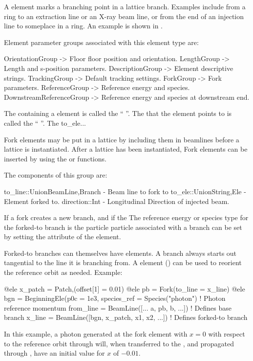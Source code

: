 A  element marks a branching point in a lattice branch. Examples include  from
a ring to an extraction line or an X-ray beam line, or  from the end of an injection line to
someplace in a ring. An example is shown in .

Element parameter groups associated with this element type are:
\TOPrule
\begin{example}
  OrientationGroup -> Floor floor position and orientation.  
  LengthGroup        -> Length and s-position parameters.  
  DescriptionGroup   -> Element descriptive strings.  
  TrackingGroup      -> Default tracking settings.  
  ForkGroup          -> Fork parameters. 
  ReferenceGroup     -> Reference energy and species. 
  DownstreamReferenceGroup -> Reference energy and species at downstream end. 
\end{example}
\BOTTOMrule

The  containing a  element is called the
`` ''. The  that the  element points to is called the
`` ''. The to_ele...

Fork elements may be put in a lattice by including them in beamlines before a lattice
is instantiated. After a lattice has been instantiated, Fork elements can be inserted
by using the  or  functions.

The components of this group are:
\begin{example}
  to_line::Union{BeamLine,Branch}   - Beam line to fork to
  to_ele::Union{String,Ele}         - Element forked to.
  direction::Int                    - Longitudinal Direction of injected beam.
\end{example}






If a fork creates a new branch, and if the The reference energy or species type for the forked-to branch is the particle 
particle associated with a branch can be set by setting the  attribute of the 
element.


Forked-to branches can themselves have  elements. A branch always starts out tangential to the
line it is branching from.  A  element () can be used to reorient the
reference orbit as needed. Example:
\begin{example}
  @ele x_patch = Patch,(offset[1] = 0.01)
  @ele pb = Fork(to_line = x_line)
  @ele bgn = BeginningEle(p0c = 1e3, species_ref = Species("photon")
                                                  ! Photon reference momentum   
  from_line = BeamLine([... a, pb, b, ...])       ! Defines base branch
  x_line = BeamLine([bgn, x_patch, x1, x2, ...])  ! Defines forked-to branch
\end{example}
In this example, a photon generated at the fork element  with $x = 0$ with respect to the
 reference orbit through  will, when transferred to the , and
propagated through , have an initial value for $x$ of $-0.01$.

